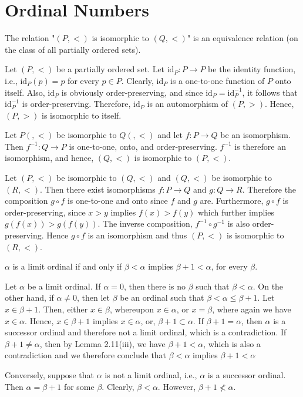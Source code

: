 \chapter{Ordinal Numbers}

 The relation "$(P, <)$ is isomorphic to $(Q, <)$" is an 
equivalence relation (on the class of all partially ordered sets).
\begin{solution}
Let $(P, <)$ be a partially ordered set. Let $\text{id}_P : P \rightarrow P$ 
be the identity function, i.e., $\text{id}_P(p) = p$ for every $p \in P$. 
Clearly, $\text{id}_P$ is a one-to-one function of $P$ onto itself. Also, 
$\text{id}_P$ is obviously order-preserving, and since 
$\text{id}_P = \text{id}^{-1}_P$, it follows that $\text{id}^{-1}_P$ is 
order-preserving. Therefore, $\text{id}_P$ is an automorphism of $(P, >)$. 
Hence, $(P, >)$ is isomorphic to itself.

Let $P(, <)$ be isomorphic to $Q(, <)$ and let $f : P \rightarrow Q$ be an 
isomorphism. Then $f^{-1} : Q \rightarrow P$ is one-to-one, onto, and 
order-preserving. $f^{-1}$ is therefore an isomorphism, and hence, $(Q, <)$ is 
isomorphic to $(P, <)$.

Let $(P, <)$ be isomorphic to $(Q, <)$ and $(Q, <)$ be isomorphic to $(R, <)$. 
Then there exist isomorphisms $f : P \rightarrow Q$ and $g : Q \rightarrow R$. 
Therefore the composition $g \circ f$ is one-to-one and onto since $f$ and $g$ 
are. Furthermore, $g \circ f$ is order-preserving, since $x > y$ implies 
$f(x) > f(y)$ which further implies $g(f(x)) > g(f(y))$. The inverse 
composition, $f^{-1} \circ g^{-1}$ is also order-preserving. Hence $g \circ f$ 
is an isomorphism and thus $(P, <)$ is isomorphic to $(R, <)$.
\end{solution}

 $\alpha$ is a limit ordinal if and only if $\beta < \alpha$ implies 
$\beta + 1 < \alpha$, for every $\beta$.
\begin{solution}
Let $\alpha$ be a limit ordinal. If $\alpha = 0$, then there is no $\beta$ such
that $\beta < \alpha$. On the other hand, if $\alpha \neq 0$, then let $\beta$ 
be an ordinal such that $\beta < \alpha \leq \beta + 1$. Let $x \in \beta + 1$. 
Then, either $x \in \beta$, whereupon $x \in \alpha$, or $x = \beta$, where 
again we have $x \in \alpha$. Hence, $x \in \beta + 1$ implies $x \in \alpha$, 
or, $\beta + 1 \subset \alpha$. If $\beta + 1 = \alpha$, then $\alpha$ is a
successor ordinal and therefore not a limit ordinal, which is a contradiction. 
If $\beta + 1 \neq \alpha$, then by Lemma 2.11(iii), we have 
$\beta + 1 < \alpha$, which is also a contradiction and we therefore conclude 
that $\beta < \alpha$ implies $\beta + 1 < \alpha$

Conversely, suppose that $\alpha$ is not a limit ordinal, i.e., $\alpha$ is a
successor ordinal. Then $\alpha = \beta + 1$ for some $\beta$. Clearly, 
$\beta < \alpha$. However, $\beta + 1 \nless \alpha$.
\end{solution}

